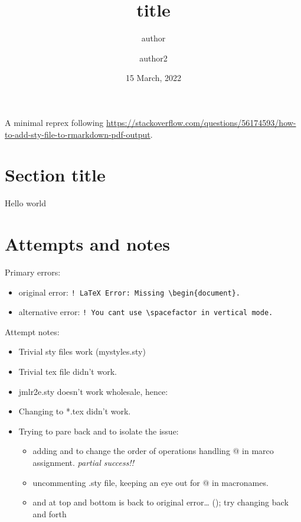 \documentclass[
]{article}
\title{title}
\author{author \and author2}
\date{15 March, 2022}
\providecommand{\tightlist}{%
  \setlength{\itemsep}{0pt}\setlength{\parskip}{0pt}}
\begin{document}
\maketitle

A minimal reprex following
\url{https://stackoverflow.com/questions/56174593/how-to-add-sty-file-to-rmarkdown-pdf-output}.

\hypertarget{section-title}{%
\section{Section title}\label{section-title}}

Hello world

\hypertarget{attempts-and-notes}{%
\section{Attempts and notes}\label{attempts-and-notes}}

Primary errors:

\begin{itemize}
\tightlist
\item
  original error:
  \texttt{!\ LaTeX\ Error:\ Missing\ \textbackslash{}begin\{document\}.}
\item
  alternative error:
  \texttt{!\ You\ can\textquotesingle{}t\ use\ \textbackslash{}spacefactor\ in\ vertical\ mode.}
\end{itemize}

Attempt notes:

\begin{itemize}
\tightlist
\item
  Trivial sty files work (mystyles.sty)
\item
  Trivial tex file didn't work.
\item
  jmlr2e.sty doesn't work wholesale, hence:
\item
  Changing to *.tex didn't work.
\item
  Trying to pare back and to isolate the issue:

  \begin{itemize}
  \tightlist
  \item
    adding \makeatletter and \makeatother to change the order of
    operations handling @ in marco assignment. \emph{partial success!!}
  \item
    uncommenting .sty file, keeping an eye out for @ in macronames.
  \item
    \makeatletter and \makeatother at top and bottom is back to original
    error\ldots{} (); try changing back and forth
  \end{itemize}
\end{itemize}
\end{document}

